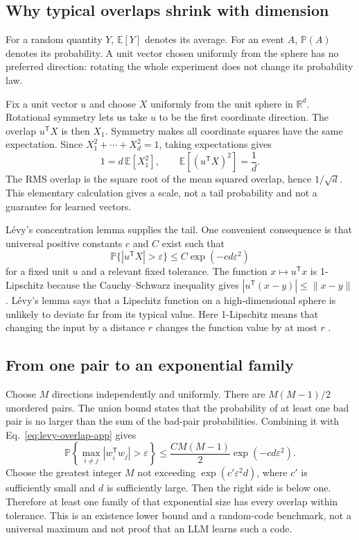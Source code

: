 \documentclass[
  aps,
  reprint,
  superscriptaddress,
  floatfix,
  nofootinbib,
  longbibliography
]{revtex4-2}
\newcommand{\R}{\mathbb{R}}
\newcommand{\E}{\mathbb{E}}
\newcommand{\Prob}{\mathbb{P}}
\newcommand{\T}{^{\mathsf T}}
\newcommand{\norm}[1]{\lVert #1\rVert}
\begin{document}
\subsection{Why typical overlaps shrink with dimension}

For a random quantity $Y$, $\E[Y]$ denotes its average.  For an event $A$,
$\Prob(A)$ denotes its probability.  A unit vector chosen uniformly from the
sphere has no preferred direction: rotating the whole experiment does not
change its probability law.

Fix a unit vector $u$ and choose $X$ uniformly from the unit sphere in
$\R^d$.  Rotational symmetry lets us take $u$ to be the first coordinate
direction.  The overlap $u\T X$ is then $X_1$.  Symmetry makes all coordinate
squares have the same expectation.  Since
$X_1^2+\cdots+X_d^2=1$, taking expectations gives
\begin{equation}
 1=d\,\E[X_1^2],
 \qquad
 \E[(u\T X)^2]=\frac1d.
 \label{eq:rms-overlap-app}
\end{equation}
The RMS overlap is the square root of the mean squared overlap, hence
$1/\sqrt d$.  This elementary calculation gives a scale, not a tail
probability and not a guarantee for learned vectors.

L\'evy's concentration lemma supplies the tail.  One convenient consequence
is that universal positive constants $c$ and $C$ exist such that
\begin{equation}
 \Prob\{|u\T X|>\varepsilon\}
 \leq C\exp(-c d\varepsilon^2)
 \label{eq:levy-overlap-app}
\end{equation}
for a fixed unit $u$ and a relevant fixed tolerance.  The function
$x\mapsto u\T x$ is 1-Lipschitz because the Cauchy--Schwarz inequality gives
$|u\T(x-y)|\leq\norm{x-y}$.  L\'evy's lemma says that a Lipschitz function on
a high-dimensional sphere is unlikely to deviate far from its typical value.
Here 1-Lipschitz means that changing the input by a distance $r$ changes the
function value by at most $r$
\cite{ledoux2001concentration,milman1986asymptotic}.

\subsection{From one pair to an exponential family}

Choose $M$ directions independently and uniformly.  There are
$M(M-1)/2$ unordered pairs.  The union bound states that the probability of at
least one bad pair is no larger than the sum of the bad-pair probabilities.
Combining it with Eq.~\eqref{eq:levy-overlap-app} gives
\begin{equation}
 \Prob\!\left\{
 \max_{i\ne j}|w_i\T w_j|>\varepsilon
 \right\}
 \leq \frac{C M(M-1)}{2}
 \exp(-c d\varepsilon^2).
 \label{eq:union-app}
\end{equation}
Choose the greatest integer $M$ not exceeding
$\exp(c'\varepsilon^2d)$, where $c'$ is sufficiently small and $d$ is
sufficiently large.  Then the right side is below one.  Therefore at least one
family of that exponential size has every overlap within tolerance.  This is
an existence lower bound and a random-code benchmark, not a universal maximum
and not proof that an LLM learns such a code.
\end{document}
